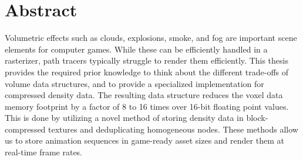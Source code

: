\section*{Abstract} \label{abstract}
Volumetric effects such as clouds, explosions, smoke, and fog are important scene elements for computer games. While these can be efficiently handled in a rasterizer, path tracers typically struggle to render them efficiently. This thesis provides the required prior knowledge to think about the different trade-offs of volume data structures, and to provide a specialized implementation for compressed density data. The resulting data structure reduces the voxel data memory footprint by a factor of 8 to 16 times over 16-bit floating point values. This is done by utilizing a novel method of storing density data in block-compressed textures and deduplicating homogeneous nodes. These methods allow us to store animation sequences in game-ready asset sizes and render them at real-time frame rates.